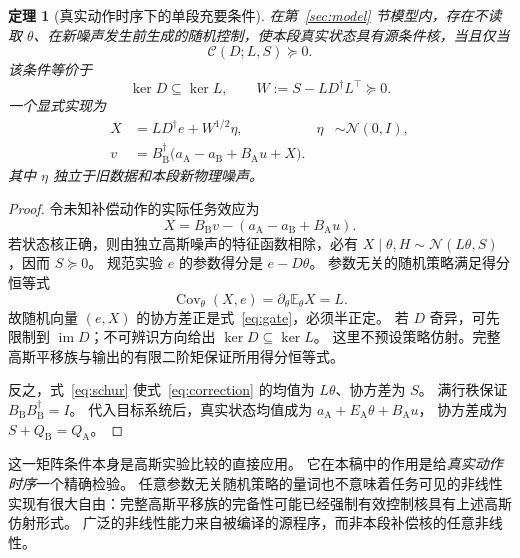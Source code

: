 \documentclass[UTF8,fontset=fandol,11pt,a4paper]{ctexart}
\newcommand{\N}{\mathcal N}
\newcommand{\E}{\mathbb E}
\newcommand{\Cov}{\operatorname{Cov}}
\newcommand{\im}{\operatorname{im}}
\newtheorem{theorem}{定理}[section]
\theoremstyle{definition}
\theoremstyle{remark}
\numberwithin{equation}{section}
\begin{document}
\begin{theorem}[真实动作时序下的单段充要条件]
\label{thm:gate}
在第~\ref{sec:model} 节模型内，存在不读取 $\theta$、在新噪声发生前生成的随机控制，使本段真实状态具有源条件核，当且仅当
\begin{equation}
 \boxed{\mathcal C(D;L,S)\succeq0.}
 \label{eq:gate-box}
\end{equation}
该条件等价于
\begin{equation}
 \ker D\subseteq\ker L,\qquad
 W:=S-LD^\dagger L^\top\succeq0.
 \label{eq:schur}
\end{equation}
一个显式实现为
\begin{align}
 X&=LD^\dagger e+W^{1/2}\eta,
 &\eta&\sim\N(0,I),\label{eq:correction}\\
 v&=B_{\mathrm B}^{\dagger}
       \bigl(a_{\mathrm A}-a_{\mathrm B}+B_{\mathrm A}u+X\bigr).
 \label{eq:control}
\end{align}
其中 $\eta$ 独立于旧数据和本段新物理噪声。
\end{theorem}

\begin{proof}
令未知补偿动作的实际任务效应为
\[
 X=B_{\mathrm B}v-(a_{\mathrm A}-a_{\mathrm B}+B_{\mathrm A}u).
\]
若状态核正确，则由独立高斯噪声的特征函数相除，必有
$X\mid\theta,H\sim\N(L\theta,S)$，因而 $S\succeq0$。
规范实验 $e$ 的参数得分是 $e-D\theta$。
参数无关的随机策略满足得分恒等式
\[
 \Cov_\theta(X,e)=\partial_\theta\E_\theta X=L.
\]
故随机向量 $(e,X)$ 的协方差正是式~\eqref{eq:gate}，必须半正定。
若 $D$ 奇异，可先限制到 $\im D$；不可辨识方向给出 $\ker D\subseteq\ker L$。
这里不预设策略仿射。完整高斯平移族与输出的有限二阶矩保证所用得分恒等式。

反之，式~\eqref{eq:schur} 使式~\eqref{eq:correction} 的均值为 $L\theta$、协方差为 $S$。
满行秩保证 $B_{\mathrm B}B_{\mathrm B}^{\dagger}=I$。
代入目标系统后，真实状态均值成为 $a_{\mathrm A}+E_{\mathrm A}\theta+B_{\mathrm A}u$，
协方差成为 $S+Q_{\mathrm B}=Q_{\mathrm A}$。
\end{proof}

这一矩阵条件本身是高斯实验比较的直接应用\cite{xiao}。
它在本稿中的作用是给\emph{真实动作时序}一个精确检验。
任意参数无关随机策略的量词也不意味着任务可见的非线性实现有很大自由：完整高斯平移族的完备性可能已经强制有效控制核具有上述高斯仿射形式。
广泛的非线性能力来自被编译的源程序，而非本段补偿核的任意非线性。
\end{document}
